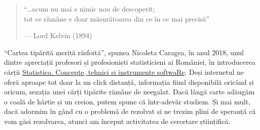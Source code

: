 \documentclass[
  11pt,
  b5paper,
  nottoc]{book}
\begin{document}
\begin{quote}
``\ldots acum nu mai e nimic nou de descoperit;\\
tot ce rămâne e doar măsurătoarea din ce în ce mai precisă''

--- Lord Kelvin (1894)
\end{quote}

``Cartea tipărită merită răsfoită'', spunea Nicoleta Caragea, în anul
2018, unul dintre apreciații profesori și profesioniști statisticieni ai
României, în introducerea cărții
\href{https://www.ujmag.ro/economie/statistica-economica/statistica-concepte-tehnici-si-instrumente-software}{Statistica.
Concepte, tehnici si instrumente softwaRe}. Deși internetul ne oferă
aproape tot doar la un click distanță, informația fiind disponibilă
oricând și oricum, sezația unei cărți tipărite rămâne de neegalat. Dacă
lângă carte adăugăm o coală de hârtie și un creion, putem spune că
într-adevăr studiem. Și mai mult, dacă adormim în gând cu o problemă de
rezolvat și ne trezim plini de speranță că vom găsi rezolvarea, atunci
am început activitatea de cercetare științifică.\\
\end{document}
